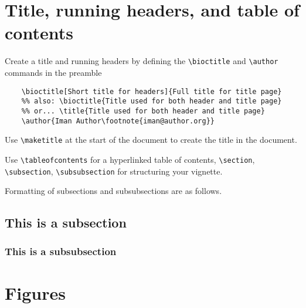 \documentclass{article}
\begin{document}
\section{Title, running headers, and table of contents}

Create a title and running headers by defining the \verb+\bioctitle+
and \verb+\author+ commands in the preamble
\begin{verbatim}
    \bioctitle[Short title for headers]{Full title for title page}
    %% also: \bioctitle{Title used for both header and title page}
    %% or... \title{Title used for both header and title page}
    \author{Iman Author\footnote{iman@author.org}}
\end{verbatim}
Use \verb+\maketitle+ at the start of the document to create the title
in the document.

Use \verb+\tableofcontents+ for a hyperlinked table of contents,
\verb+\section+, \verb+\subsection+, \verb+\subsubsection+ for
structuring your vignette.

Formatting of subsections and subsubsections are as follows.

\subsection{This is a subsection}

\subsubsection{This is a subsubsection}

\section{Figures}\label{incfig}
\end{document}
